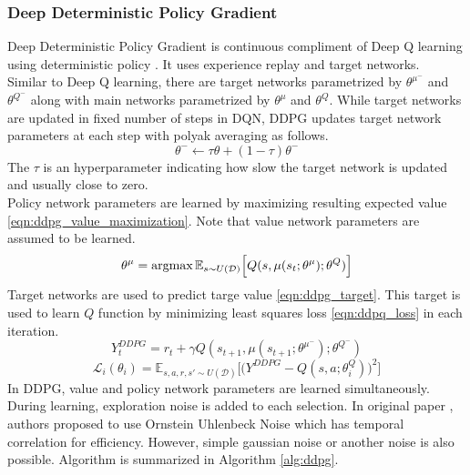 \subsubsection{Deep Deterministic Policy Gradient}
Deep Deterministic Policy Gradient is continuous compliment of Deep Q learning using deterministic policy \cite{lillicrap_continuous_2019}. It uses experience replay and target networks. \\
Similar to Deep Q learning, there are target networks parametrized by $\theta^{\mu^-}$ and $\theta^{Q^-}$ along with main networks parametrized by $\theta^{\mu}$ and $\theta^{Q}$. While target networks are updated in fixed number of steps in DQN, DDPG updates target network parameters at each step with polyak averaging as follows. \\
\begin{equation}
\label{eqn:target_update}
\theta^- \leftarrow \tau \theta + (1-\tau) \theta^-
\end{equation}
The $\tau$ is an hyperparameter indicating how slow the target network is updated and usually close to zero. \\
Policy network parameters are learned by maximizing resulting expected value \ref{eqn:ddpg_value_maximization}. Note that value network parameters are assumed to be learned. \\
\begin{equation}
\label{eqn:ddpg_value_maximization}
\theta^\mu = \operatorname{\textup{argmax}} \mathbb{E}_{s \sim U(\mathcal{D})} \Big[ Q(s, \mu(s_t;\theta^\mu);\theta^Q) \Big]
\end{equation}
Target networks are used to predict targe value \ref{eqn:ddpg_target}. This target is used to learn $Q$ function by minimizing least squares loss \ref{eqn:ddpq_loss} in each iteration. \\
\begin{equation}
\label{eqn:ddpg_target}
Y_t^{DDPG} = r_t + \gamma Q(s_{t+1}, \mu(s_{t+1};\theta^{\mu^-});\theta^{Q^-})
\end{equation}
\begin{equation}
\label{eqn:ddpg_loss}
\mathcal{L}_i(\theta_i) = \mathbb{E}_{s,a,r,s'\sim U(\mathcal{D})}\Big[\big( Y^{DDPG} - Q(s,a;\theta^Q_i) \big) ^ 2 \Big]
\end{equation}
In DDPG, value and policy network parameters are learned simultaneously. During learning, exploration noise is added to each selection. In original paper \cite{lillicrap_continuous_2019}, authors proposed to use Ornstein Uhlenbeck Noise \cite{uhlenbeck_theory_1930} which has temporal correlation for efficiency. However, simple gaussian noise or another noise is also possible. Algorithm is summarized in Algorithm \ref{alg:ddpg}. \\
